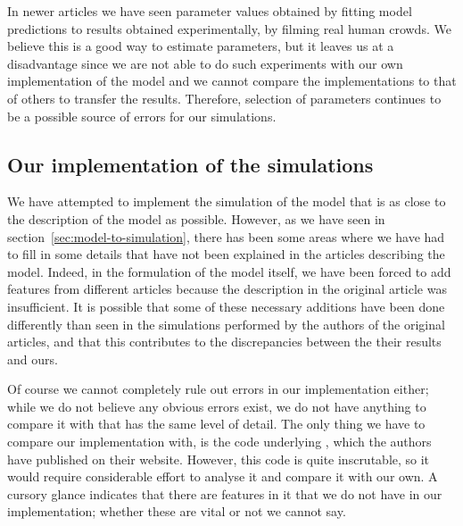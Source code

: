 In newer articles we have seen parameter values obtained by fitting model 
predictions to results obtained experimentally, by filming real human crowds.  
We believe this is a good way to estimate parameters, but it leaves us at a 
disadvantage since we are not able to do such experiments with our own 
implementation of the model and we cannot compare the implementations to that 
of others to transfer the results. Therefore, selection of parameters 
continues to be a possible source of errors for our simulations.

\subsection{Our implementation of the simulations}
\label{sec:random-errors}
We have attempted to implement the simulation of the model that is as close to 
the description of the model as possible. However, as we have seen in 
section~\ref{sec:model-to-simulation}, there has been some areas where we have 
had to fill in some details that have not been explained in the articles 
describing the model. Indeed, in the formulation of the model itself, we have 
been forced to add features from different articles because the description in 
the original article was insufficient. It is possible that some of these 
necessary additions have been done differently than seen in the simulations 
performed by the authors of the original articles, and that this contributes 
to the discrepancies between the their results and ours.

Of course we cannot completely rule out errors in our implementation either; 
while we do not believe any obvious errors exist, we do not have anything to 
compare it with that has the same level of detail. The only thing we have to 
compare our implementation with, is the code underlying \cite{helbing00}, 
which the authors have published on their website. However, this code is quite 
inscrutable, so it would require considerable effort to analyse it and compare 
it with our own. A cursory glance indicates that there are features in it that 
we do not have in our implementation; whether these are vital or not we cannot 
say.


